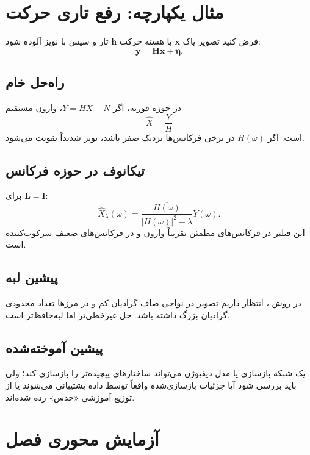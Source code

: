 \documentclass[12pt,openany,oneside]{book}
\newcommand{\abs}[1]{\left\lvert #1\right\rvert}
\newcommand{\vect}[1]{\bm{#1}}
\begin{document}
\section{مثال یکپارچه: رفع تاری حرکت}

فرض کنید تصویر پاک \(\vect x\) با هسته حرکت \(\vect h\) تار و سپس با نویز آلوده شود:
\begin{equation}
\vect y=\vect H\vect x+\vect\eta.
\end{equation}

\subsection{راه‌حل خام}
در حوزه فوریه، اگر \(Y=HX+N\)، وارون مستقیم
\begin{equation}
\widehat X=\frac{Y}{H}
\end{equation}
است. اگر \(H(\omega)\) در برخی فرکانس‌ها نزدیک صفر باشد، نویز شدیداً تقویت می‌شود.

\subsection{تیکانوف در حوزه فرکانس}
برای \(\vect L=\vect I\):
\begin{equation}
\widehat X_\lambda(\omega)
=\frac{\overline{H(\omega)}}{\abs{H(\omega)}^2+\lambda}Y(\omega).
\end{equation}
این فیلتر در فرکانس‌های مطمئن تقریباً وارون و در فرکانس‌های ضعیف سرکوب‌کننده است.

\subsection{پیشین لبه}
در روش ، انتظار داریم تصویر در نواحی صاف گرادیان کم و در مرزها تعداد محدودی گرادیان بزرگ داشته باشد.
حل غیرخطی‌تر اما لبه‌حافظ‌تر است.

\subsection{پیشین آموخته‌شده}
یک شبکه بازسازی یا مدل دیفیوژن می‌تواند ساختارهای پیچیده‌تر را بازسازی کند؛ ولی باید بررسی شود آیا جزئیات
بازسازی‌شده واقعاً توسط داده پشتیبانی می‌شوند یا از توزیع آموزشی «حدس» زده شده‌اند.

\section{آزمایش محوری فصل}
\end{document}
